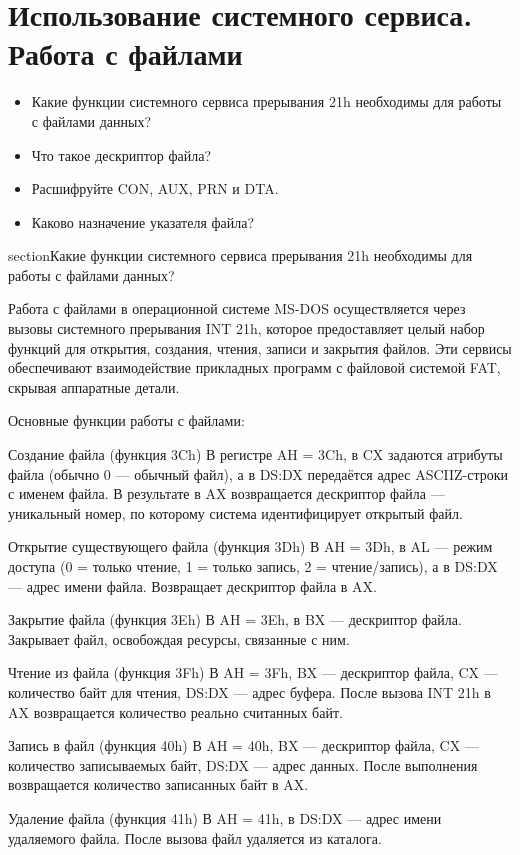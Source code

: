 \chapter{Использование системного сервиса. Работа с файлами}
\begin{itemize}
\item Какие функции системного сервиса прерывания 21h необходимы для работы с
файлами данных?
\item Что такое дескриптор файла?
\item Расшифруйте CON, AUX, PRN и DTA.
\item Каково назначение указателя файла?
\end{itemize}

section{Какие функции системного сервиса прерывания 21h необходимы для работы с файлами данных?}

Работа с файлами в операционной системе MS-DOS осуществляется через вызовы системного прерывания INT 21h, которое предоставляет целый набор функций для открытия, создания, чтения, записи и закрытия файлов. Эти сервисы обеспечивают взаимодействие прикладных программ с файловой системой FAT, скрывая аппаратные детали.

Основные функции работы с файлами:

Создание файла (функция 3Ch)
В регистре AH = 3Ch, в CX задаются атрибуты файла (обычно 0 — обычный файл), а в DS:DX передаётся адрес ASCIIZ-строки с именем файла.
В результате в AX возвращается дескриптор файла — уникальный номер, по которому система идентифицирует открытый файл.

Открытие существующего файла (функция 3Dh)
В AH = 3Dh, в AL — режим доступа (0 = только чтение, 1 = только запись, 2 = чтение/запись), а в DS:DX — адрес имени файла.
Возвращает дескриптор файла в AX.

Закрытие файла (функция 3Eh)
В AH = 3Eh, в BX — дескриптор файла.
Закрывает файл, освобождая ресурсы, связанные с ним.

Чтение из файла (функция 3Fh)
В AH = 3Fh, BX — дескриптор файла, CX — количество байт для чтения, DS:DX — адрес буфера.
После вызова INT 21h в AX возвращается количество реально считанных байт.

Запись в файл (функция 40h)
В AH = 40h, BX — дескриптор файла, CX — количество записываемых байт, DS:DX — адрес данных.
После выполнения возвращается количество записанных байт в AX.

Удаление файла (функция 41h)
В AH = 41h, в DS:DX — адрес имени удаляемого файла.
После вызова файл удаляется из каталога.

